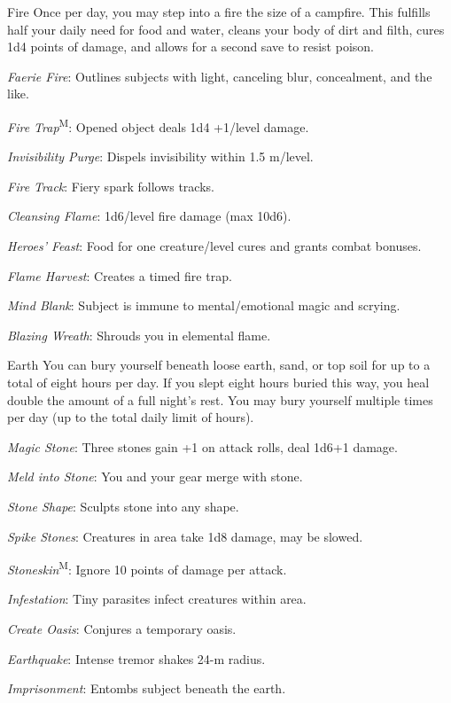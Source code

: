 {Fire}
{Once per day, you may step into a fire the size of a campfire. This fulfills half your daily need for food and water, cleans your body of dirt and filth, cures 1d4 points of damage, and allows for a second save to resist poison.}
{
	\item \textit{Faerie Fire}: Outlines subjects with light, canceling blur, concealment, and the like.
	\item \textit{Fire Trap}\textsuperscript{M}: Opened object deals 1d4 +1/level damage.
	\item \textit{Invisibility Purge}: Dispels invisibility within 1.5 m/level.
	\item \textit{Fire Track}: Fiery spark follows tracks.
	\item \textit{Cleansing Flame}: 1d6/level fire damage (max 10d6).
	\item \textit{Heroes' Feast}: Food for one creature/level cures and grants combat bonuses.
	\item \textit{Flame Harvest}: Creates a timed fire trap.
	\item \textit{Mind Blank}: Subject is immune to mental/emotional magic and scrying.
	\item \textit{Blazing Wreath}: Shrouds you in elemental flame.
}

{Earth}
{You can bury yourself beneath loose earth, sand, or top soil for up to a total of eight hours per day. If you slept eight hours buried this way, you heal double the amount of a full night's rest. You may bury yourself multiple times per day (up to the total daily limit of hours).}
{
	\item \textit{Magic Stone}: Three stones gain +1 on attack rolls, deal 1d6+1 damage.
	\item \textit{Meld into Stone}: You and your gear merge with stone.
	\item \textit{Stone Shape}: Sculpts stone into any shape.
	\item \textit{Spike Stones}: Creatures in area take 1d8 damage, may be slowed.
	\item \textit{Stoneskin}\textsuperscript{M}: Ignore 10 points of damage per attack.
	\item \textit{Infestation}: Tiny parasites infect creatures within area.
	\item \textit{Create Oasis}: Conjures a temporary oasis.
	\item \textit{Earthquake}: Intense tremor shakes 24-m radius.
	\item \textit{Imprisonment}: Entombs subject beneath the earth.
}

